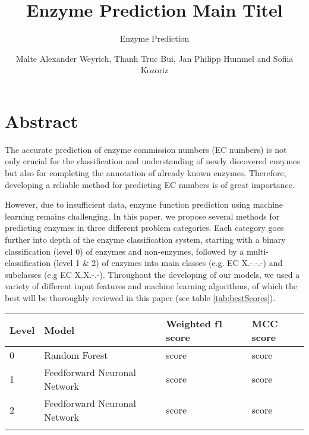 \documentclass{bioinfo}
\begin{document}

\subtitle{Enzyme Prediction}

\title[]{Enzyme Prediction Main Titel}
\author[]{Malte Alexander Weyrich, Thanh Truc Bui, Jan Philipp Hummel
and  Sofiia Kozoriz}
\address{}

\corresp{}

\history{}

\editor{}


\maketitle


\section{Abstract}
The accurate prediction of enzyme commission numbers (EC numbers) is not only crucial for 
the classification and understanding of newly discovered enzymes but also for completing the annotation of already known enzymes.
Therefore, developing a reliable method for predicting EC numbers is of great importance.

However, due to insufficient data, enzyme function prediction using machine learning remains challenging.
In this paper, we propose several methods for predicting enzymes in three different problem categories. Each category goes further into depth
of the enzyme classification system, starting with a binary classification (level 0) of enzymes and non-enzymes, followed by a multi-classification (level 1 \& 2) of enzymes into main classes (e.g. EC X.-.-.-) and subclasses (e.g EC X.X.-.-).
Throughout the developing of our models, we used a variety of different input features and machine learning algorithms, of which the best will be thoroughly reviewed in this paper (see table \ref{tab:bestScores}).

\begin{table}[!htbp]
 {\begin{tabular}{@{}llll@{}}\toprule 
		Level &  Model & Weighted f1 score & MCC score\\\midrule
		0 & Random Forest & score & score\\
		1 &  Feedforward Neuronal Network & score & score \\
		2 &  Feedforward Neuronal Network & score & score\\\botrule
\end{tabular}}{}
\end{table}
\end{document}
